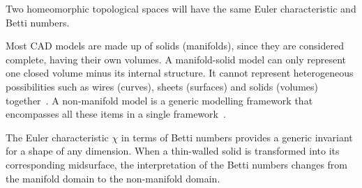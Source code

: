 \documentclass[11pt,a4paper]{article}
\begin{document}

Two homeomorphic topological spaces will have the same Euler characteristic
and Betti numbers.


Most CAD models are made up of solids (manifolds), since they are considered
complete, having their own volumes. A manifold-solid model can only represent
one closed volume minus its internal structure. It cannot represent
heterogeneous possibilities such as wires (curves), sheets (surfaces) and
solids (volumes) together~\cite{Yamaguchi1995}. A non-manifold model is a
generic modelling framework that encompasses all these items in a single
framework~\cite{Lee2001}.

The Euler characteristic $\chi$ in terms of Betti numbers provides a generic
invariant for a shape of any dimension. When a thin-walled solid is
transformed into its corresponding midsurface, the interpretation of the
Betti numbers changes from the manifold domain to the non-manifold domain.

%
%
%
\end{document}
